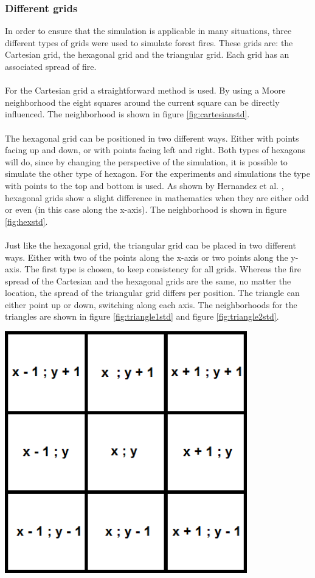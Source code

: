 \documentclass{article}
\newenvironment{Figure}
  {\par\medskip\noindent\minipage{\linewidth}}
  {\endminipage\par\medskip}
\begin{document}
\begin{multicols}{2}
\subsubsection*{Different grids}
In order to ensure that the simulation is applicable in many situations, three different types of grids were used to simulate forest fires. These grids are: the Cartesian grid, the hexagonal grid and the triangular grid. Each grid has an associated spread of fire.\\\\
For the Cartesian grid a straightforward method is used. By using a Moore neighborhood the eight squares around the current square can be directly influenced. The neighborhood is shown in figure \ref{fig:cartesianstd}.\\\\
The hexagonal grid can be positioned in two different ways. Either with points facing up and down, or with points facing left and right. Both types of hexagons will do, since by changing the perspective of the simulation, it is possible to simulate the other type of hexagon. For the experiments and simulations the type with points to the top and bottom is used. As shown by Hernandez et al. \cite{HernandezEncinas20071213}, hexagonal grids show a slight difference in mathematics when they are either odd or even (in this case along the x-axis). The neighborhood is shown in figure \ref{fig:hexstd}.  \\\\
Just like the hexagonal grid, the triangular grid can be placed in two different ways. Either with two of the points along the x-axis or two points along the y-axis. The first type is chosen, to keep consistency for all grids. Whereas the fire spread of the Cartesian and the hexagonal grids are the same, no matter the location, the spread of the triangular grid differs per position. The triangle can either point up or down, switching along each axis. The neighborhoods for the triangles are shown in figure \ref{fig:triangle1std} and figure \ref{fig:triangle2std}.
\begin{Figure}
 \centering
 \includegraphics[width=0.79\textwidth]{imgs/cartesian.png}

\end{Figure}
\end{multicols}
\end{document}
